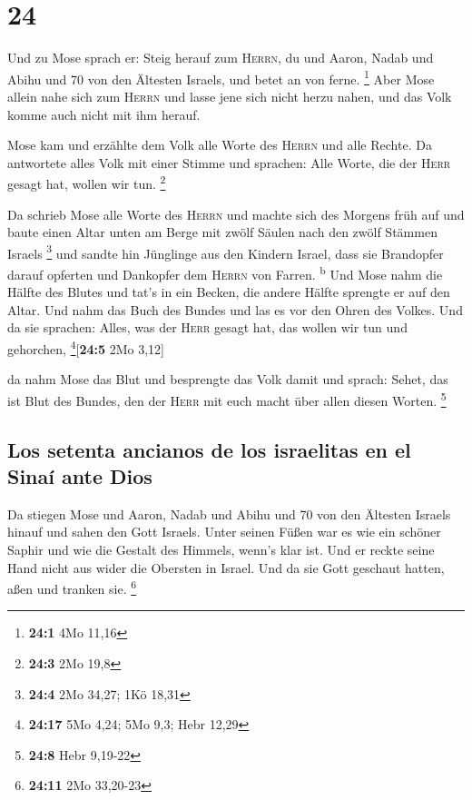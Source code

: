 \hypertarget{section-23}{%
\section{24}\label{section-23}}

 Und zu Mose sprach er: Steig herauf zum \textsc{Herrn},
du und Aaron, Nadab und Abihu und 70 von den Ältesten Israels, und betet
an von ferne. \footnote{\textbf{24:1} 4Mo 11,16}  Aber
Mose allein nahe sich zum \textsc{Herrn} und lasse jene sich nicht herzu
nahen, und das Volk komme auch nicht mit ihm herauf.

 Mose kam und erzählte dem Volk alle Worte des
\textsc{Herrn} und alle Rechte. Da antwortete alles Volk mit einer
Stimme und sprachen: Alle Worte, die der \textsc{Herr} gesagt hat,
wollen wir tun. \footnote{\textbf{24:3} 2Mo 19,8}

 Da schrieb Mose alle Worte des \textsc{Herrn} und machte
sich des Morgens früh auf und baute einen Altar unten am Berge mit zwölf
Säulen nach den zwölf Stämmen Israels \footnote{\textbf{24:4} 2Mo 34,27;
  1Kö 18,31}  und sandte hin Jünglinge aus den Kindern
Israel, dass sie Brandopfer darauf opferten und Dankopfer dem
\textsc{Herrn} von Farren. \textsuperscript{b}  Und Mose
nahm die Hälfte des Blutes und tat's in ein Becken, die andere Hälfte
sprengte er auf den Altar.  Und nahm das Buch des Bundes
und las es vor den Ohren des Volkes. Und da sie sprachen: Alles, was der
\textsc{Herr} gesagt hat, das wollen wir tun und gehorchen,
\footnote{\textbf{24:17} 5Mo 4,24; 5Mo 9,3; Hebr 12,29}{[}\textbf{24:5}
2Mo 3,12{]}

 da nahm Mose das Blut und besprengte das Volk damit und
sprach: Sehet, das ist Blut des Bundes, den der \textsc{Herr} mit euch
macht über allen diesen Worten. \footnote{\textbf{24:8} Hebr 9,19-22}

\hypertarget{los-setenta-ancianos-de-los-israelitas-en-el-sinauxed-ante-dios}{%
\subsection{Los setenta ancianos de los israelitas en el Sinaí ante
Dios}\label{los-setenta-ancianos-de-los-israelitas-en-el-sinauxed-ante-dios}}

 Da stiegen Mose und Aaron, Nadab und Abihu und 70 von den
Ältesten Israels hinauf  und sahen den Gott Israels.
Unter seinen Füßen war es wie ein schöner Saphir und wie die Gestalt des
Himmels, wenn's klar ist.  Und er reckte seine Hand nicht
aus wider die Obersten in Israel. Und da sie Gott geschaut hatten, aßen
und tranken sie. \footnote{\textbf{24:11} 2Mo 33,20-23}

